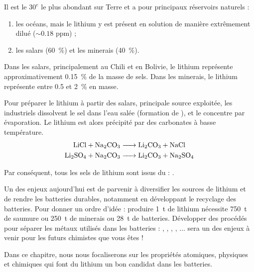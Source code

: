 Il est le $30^e$ le plus abondant sur Terre et a pour principaux réservoirs naturels :
\begin{enumerate}
\item les océans, mais le lithium y est présent en solution de manière extrêmement dilué ($\sim 0.18$ \si{{ppm}}) ;
\item les salars (\SI{60}{\percent}) et les minerais (\SI{40}{\percent}).
\end{enumerate}

Dans les salars, principalement au Chili et en Bolivie, le lithium représente approximativement \SI{0.15}{\percent} de la masse de sels. Dans les minerais, le lithium représente entre 0.5 et \SI{2}{\percent} en masse.

Pour préparer le lithium à partir des salars, principale source exploitée, les industriels dissolvent le sel dans l'eau salée (formation de ), et le concentre par évaporation. Le lithium est alors précipité par des carbonates à basse température.
\begin{align*}
\ce{LiCl + Na2CO3 &-> Li2CO3 + NaCl} \\
\ce{Li2SO4 + Na2CO3 &-> Li2CO3 + Na2SO4}
\end{align*}

Par conséquent, tous les sels de lithium sont issus du  : .

Un des enjeux aujourd'hui est de parvenir à diversifier les sources de lithium et de rendre les batteries durables, notamment en développant le recyclage des batteries. Pour donner un ordre d'idée : produire \SI{1}{\tonne} de lithium nécessite \SI{750}{\tonne} de saumure ou \SI{250}{\tonne} de minerais ou \SI{28}{\tonne} de batteries. Développer des procédés pour séparer les métaux utilisés dans les batteries : , , , , $\ldots$ sera un des enjeux à venir pour les futurs chimistes que vous êtes !

Dans ce chapitre, nous nous focaliserons sur les propriétés atomiques, physiques et chimiques qui font du lithium un bon candidat dans les batteries.


